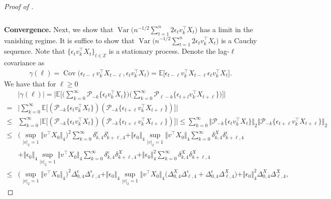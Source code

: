 \documentclass[11pt]{article}
\DeclareMathOperator*{\cov}{Cov}
\DeclareMathOperator*{\var}{Var}
\theoremstyle{plain}
\theoremstyle{definition}
\begin{document}
\begin{proof}[Proof of ]
\begin{align*}
    \end{align*}
\
\\
{\bf Convergence.} Next, we show that $\var\big(n^{-1/2}\sum_{t = 1}^n 2\epsilon_t v_k^{\top}X_t \big)$ has a limit in the vanishing regime. It is suffice to show that $\var\big(n^{-1/2}\sum_{t = 1}^n 2\epsilon_t v_k^{\top}X_t\big)$ is a Cauchy sequence.
Note that $\{\epsilon_t v_k^{\top}X_t\}_{t \in \mathbb{Z}}$ is a stationary process. Denote the lag-$\ell$ covariance as 
\begin{align*}
    \gamma(\ell) = \cov\big(\epsilon_{t-\ell} v_k^{\top}X_{t-\ell}, \epsilon_t v_k^{\top}X_{t}\big) = \mathbb E\big[\epsilon_{t-\ell} v_k^{\top}X_{t-\ell} \epsilon_t v_k^{\top}X_{t}\big].
\end{align*}
We have that for $\ell \geq 0$
\begin{align*}
    &|\gamma(\ell)| = \bigg|\mathbb{E}\Big[\Big(\sum_{k = 0}^{\infty}\mathcal{P}_{-k}\{\epsilon_tv_k^{\top}X_{t}\}\Big)\Big(\sum_{k = 0}^{\infty}\mathcal{P}_{\ell-k}\{\epsilon_{t+l}v_k^{\top}X_{t+\ell}\}\Big)\Big]\bigg|\\
    =& \bigg|\sum_{k = 0}^{\infty}\mathbb{E}\big[(\mathcal{P}_{-k}\{\epsilon_tv_k^{\top}X_{t}\})(\mathcal{P}_{-k}\{\epsilon_{t+\ell}v_k^{\top}X_{t+\ell}\})\big]\bigg|\\
    \leq& \sum_{k =     0}^{\infty}\Big|\mathbb{E}\big[(\mathcal{P}_{-k}\{\epsilon_tv_k^{\top}X_{t}\})(\mathcal{P}_{-k}\{\epsilon_{t+\ell}v_k^{\top}X_{t+\ell}\})\big]\Big| \leq \sum_{k = 0}^{\infty}\Vert \mathcal{P}_{-k}\{\epsilon_tv_k^{\top}X_{t}\} \Vert_2 \Vert \mathcal{P}_{-k}\{\epsilon_{t+\ell}v_k^{\top}X_{t+\ell}\}\Vert_2\\
    \leq& \Big(\sup_{|v|_2 = 1}\big\Vert v^{\top} X_0 \big\Vert_4\Big)^2\sum_{k = 0}^{\infty}\delta^{\epsilon}_{k,4}\delta^{\epsilon}_{k+\ell,4} + \Vert \epsilon_0 \Vert_4\sup_{|v|_2 = 1}\big\Vert v^{\top} X_0 \big\Vert_4\sum_{k = 0}^{\infty}\delta^{X}_{k,4}\delta^{\epsilon}_{k+\ell,4}\\
    &+\Vert \epsilon_0 \Vert_4\sup_{|v|_2 = 1}\big\Vert v^{\top} X_0 \big\Vert_4\sum_{k = 0}^{\infty}\delta^{\epsilon}_{k,4}\delta^{X}_{k+\ell,4} + \Vert \epsilon_0 \Vert_4^2\sum_{k = 0}^{\infty}\delta^{X}_{k,4}\delta^{X}_{k+\ell,4}\\
    \leq& \Big(\sup_{|v|_2 = 1}\big\Vert v^{\top} X_0 \big\Vert_4\Big)^2\Delta^{\epsilon}_{0,4}\Delta^{\epsilon}_{\ell,4} + \Vert \epsilon_0 \Vert_4\sup_{|v|_2 = 1}\big\Vert v^{\top} X_0 \big\Vert_4\big(\Delta^{X}_{0,4}\Delta^{\epsilon}_{\ell,4} + \Delta^{\epsilon}_{0,4}\Delta^{X}_{\ell,4}\big) + \Vert \epsilon_0 \Vert_4^2\Delta^{X}_{0,4}\Delta^{X}_{\ell,4},

\end{align*}
\end{proof}
\end{document}
